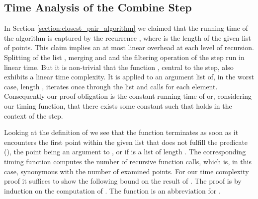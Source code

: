 \begin{isabellebody}
\begin{isamarkuptext}
\subsection{Time Analysis of the Combine Step}

In Section \ref{section:closest_pair_algorithm} we claimed that the running time of the algorithm is
captured by the recurrence ,
where  is the length of the given list of points. This claim implies an at most linear overhead
at each level of recursion. Splitting of the list , merging  and  and
the filtering operation of the  step run in linear time. But it is non-trivial that the
function , central to the  step, also exhibits a linear
time complexity. It is applied to an argument list of, in the worst case, length , iterates
once through the list and calls  for each element. Consequently our proof obligation
is the constant running time of  or, considering our timing function, that there exists
some constant  such that  holds in the context of the  step.

Looking at the definition of  we see that the function terminates as soon as
it encounters the first point within the given list  that does not fulfill the predicate
(), the point  being an argument to ,
or if  is a list of length . The corresponding timing function 
computes the number of recursive function calls, which is, in this case, synonymous with the number of examined points.
For our time complexity proof it suffices to show the following bound on the result of  .
The proof is by induction on the computation of . The function  is
an abbreviation for .


\end{isamarkuptext}
\end{isabellebody}
